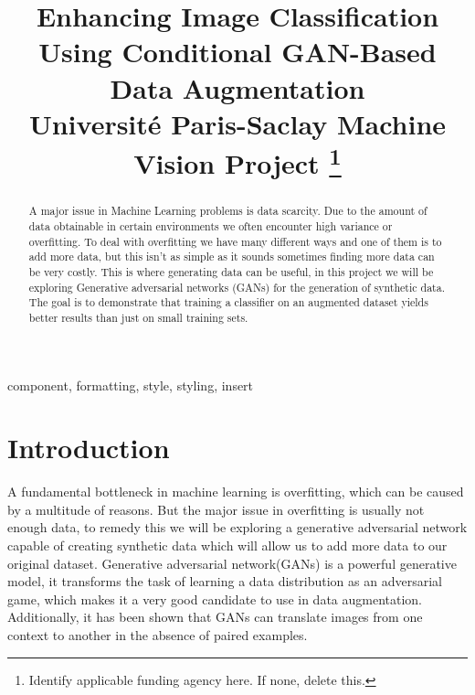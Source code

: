 \documentclass[conference]{IEEEtran}
\begin{document}
\title{Enhancing Image Classification Using Conditional GAN-Based Data Augmentation\\
{\footnotesize Université Paris-Saclay Machine Vision Project}
\thanks{Identify applicable funding agency here. If none, delete this.}
}

\author{
}

\maketitle

\begin{abstract}
A major issue in Machine Learning problems is data scarcity. Due to the amount of data obtainable in certain environments we often encounter high variance or overfitting. To deal with overfitting we have many different ways and one of them is to add more data, but this isn't as simple as it sounds sometimes finding more data can be very costly. This is where generating data can be useful, in this project we will be exploring Generative adversarial networks (GANs) for the generation of synthetic data. The goal is to demonstrate that training a classifier on an augmented dataset yields better results than just on small training sets.
\end{abstract}

\begin{IEEEkeywords}
component, formatting, style, styling, insert
\end{IEEEkeywords}

\section{Introduction}
A fundamental bottleneck in machine learning is overfitting, which can be caused by a multitude of reasons. But the major issue in overfitting is usually not enough data, to remedy this we will be exploring a generative adversarial network capable of creating synthetic data which will allow us to add more data to our original dataset. Generative adversarial network(GANs) is a powerful generative model, it transforms the task of learning a data distribution as an adversarial game, which makes it a very good candidate to use in data augmentation. Additionally, it has been shown that GANs can translate images from one context to another in the absence of paired examples\cite{DBLP:journals/corr/ZhuPIE17}.
\end{document}
